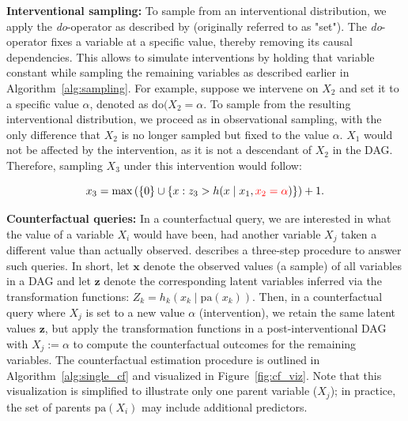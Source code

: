 % 


\textbf{Interventional sampling:} To sample from an interventional distribution, we apply the \textit{do}-operator as described by \citet{pearl1995} (originally referred to as "set"). The \textit{do}-operator fixes a variable at a specific value, thereby removing its causal dependencies. This allows to simulate interventions by holding that variable constant while sampling the remaining variables as described earlier in Algorithm~\ref{alg:sampling}. For example, suppose we intervene on $X_2$ and set it to a specific value $\alpha$, denoted as $\text{do}(X_2 = \alpha$. To sample from the resulting interventional distribution, we proceed as in observational sampling, with the only difference that $X_2$ is no longer sampled but fixed to the value $\alpha$. $X_1$ would not be affected by the intervention, as it is not a descendant of $X_2$ in the DAG. Therefore, sampling $X_3$ under this intervention would follow:

\[
x_3 = \max \left( \{0\} \cup \left\{ x : z_3 > h(x \mid x_1, \textcolor{red}{x_2 = \alpha}) \right\} \right) + 1.
\]


\textbf{Counterfactual queries:} In a counterfactual query, we are interested in what the value of a variable $X_i$ would have been, had another variable $X_j$ taken a different value than actually observed. \citet{pearl_book2009} describes a three-step procedure to answer such queries. In short, let $\mathbf{x}$ denote the observed values (a sample) of all variables in a DAG and let $\mathbf{z}$ denote the corresponding latent variables inferred via the transformation functions: $Z_k = h_k(x_k \mid \text{pa}(x_k))$. Then, in a counterfactual query where $X_j$ is set to a new value $\alpha$ (intervention), we retain the same latent values $\mathbf{z}$, but apply the transformation functions in a post-interventional DAG with $X_j := \alpha$ to compute the counterfactual outcomes for the remaining variables.
The counterfactual estimation procedure is outlined in Algorithm~\ref{alg:single_cf} and visualized in Figure~\ref{fig:cf_viz}. Note that this visualization is simplified to illustrate only one parent variable ($X_j$); in practice, the set of parents $\text{pa}(X_i)$ may include additional predictors.

